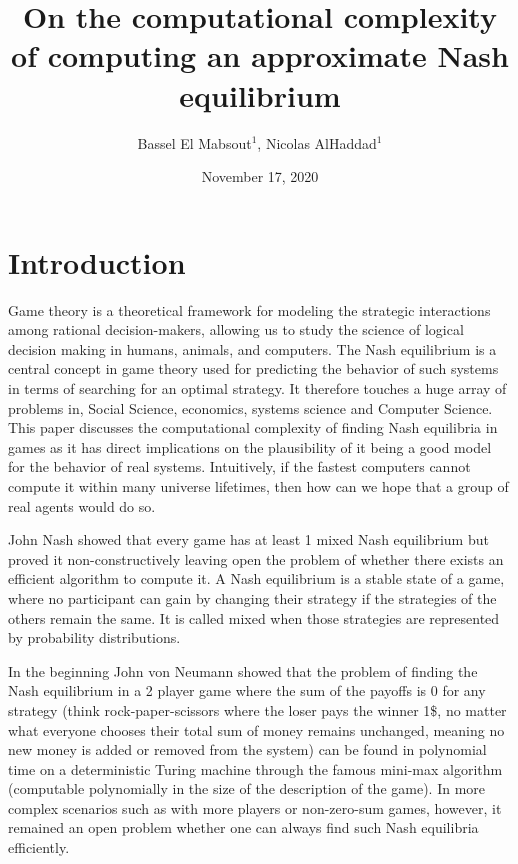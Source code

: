 \documentclass[11pt]{article}
\author{Bassel El Mabsout$^1$, Nicolas AlHaddad$^1$}
\title{On the computational complexity of computing an approximate Nash equilibrium}
\date{November 17, 2020}
\begin{document}
	\maketitle
\section{Introduction}

Game theory is a theoretical framework for modeling the strategic interactions among rational decision-makers, allowing us to study the science of logical decision making in humans, animals, and computers.
The Nash equilibrium is a central concept in game theory used for predicting the behavior of such systems in terms of searching for an optimal strategy. It therefore touches a huge array of problems in, Social Science, economics, systems science and Computer Science. This paper discusses the computational complexity of finding Nash equilibria in games as it has direct implications on the plausibility of it being a good model for the behavior of real systems. Intuitively, if the fastest computers cannot compute it within many universe lifetimes, then how can we hope that a group of real agents would do so.


John Nash showed \cite{Nash48} that every game has at least 1 mixed Nash equilibrium but proved it non-constructively leaving open the problem of whether there exists an efficient algorithm to compute it. A Nash equilibrium is
a stable state of a game, where no participant can gain by changing their strategy if the strategies of the others remain the same. It is called mixed when those strategies are represented by probability distributions.

In the beginning John von Neumann showed \cite{NeumannZurTD} that the problem of finding the Nash equilibrium in a 2 player game where the sum of the payoffs is 0 for any strategy (think rock-paper-scissors where the loser pays the winner 1\$, no matter what everyone chooses their total sum of money remains unchanged, meaning no new money is added or removed from the system) can be found in polynomial time on a deterministic Turing machine through the famous mini-max algorithm (computable polynomially in the size of the description of the game). In more complex scenarios such as with more players or non-zero-sum games, however, it remained an open problem whether one can always find such Nash equilibria efficiently. 
\end{document}
